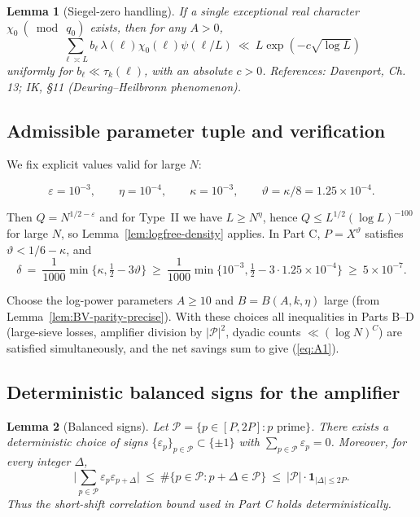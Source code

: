 \documentclass[11pt]{article}
\def\eqref#1{(\ref{#1})}%
\newtheorem{lemma}{Lemma}[part]
\theoremstyle{definition}
\theoremstyle{remark}
\numberwithin{equation}{part}
\begin{document}
\begin{lemma}[Siegel-zero handling]\label{lem:siegel}
	If a single exceptional real character $\chi_0\ (\bmod\ q_0)$ exists, then for any $A>0$,
	\[
		\sum_{\ell\asymp L} b_\ell\,\lambda(\ell)\chi_0(\ell)\psi(\ell/L)\ \ll\ L\exp(-c\sqrt{\log L})
	\]
	uniformly for $b_\ell\ll \tau_k(\ell)$, with an absolute $c>0$. References: Davenport, Ch. 13; IK, §11 (Deuring--Heilbronn phenomenon).
\end{lemma}

\subsection{Admissible parameter tuple and verification}

We fix explicit values valid for large $N$:

\[
	\varepsilon=10^{-3},\qquad \eta=10^{-4},\qquad \kappa=10^{-3},\qquad \vartheta=\kappa/8=1.25\times 10^{-4}.
\]

Then $Q=N^{1/2-\varepsilon}$ and for Type~II we have $L\ge N^{\eta}$, hence $Q\le L^{1/2}(\log L)^{-100}$ for large $N$, so Lemma~\ref{lem:logfree-density} applies. In Part C, $P=X^{\vartheta}$ satisfies $\vartheta<1/6-\kappa$, and
\[
	\delta\ =\ \frac1{1000}\min\{\kappa,\tfrac12-3\vartheta\}\ \ge\ \frac{1}{1000}\min\{10^{-3},\tfrac12-3\cdot 1.25\times 10^{-4}\}\ \ge\ 5\times 10^{-7}.
\]

Choose the log-power parameters $A\ge 10$ and $B=B(A,k,\eta)$ large (from Lemma~\ref{lem:BV-parity-precise}). With these choices all inequalities in Parts B--D (large-sieve losses, amplifier division by $|\mathcal P|^2$, dyadic counts $\ll (\log N)^C$) are satisfied simultaneously, and the net savings sum to give \eqref{eq:A1}.

\subsection{Deterministic balanced signs for the amplifier}

\begin{lemma}[Balanced signs]\label{lem:balanced-signs}
	Let $\mathcal P=\{p\in[P,2P]: p\text{ prime}\}$. There exists a deterministic choice of signs $\{\varepsilon_p\}_{p\in\mathcal P}\subset\{\pm 1\}$ with $\sum_{p\in\mathcal P}\varepsilon_p=0$. Moreover, for every integer $\Delta$,
	\[
		\Big|\sum_{p\in\mathcal P}\varepsilon_p\varepsilon_{p+\Delta}\Big|\ \le\ \#\{p\in\mathcal P: p+\Delta\in\mathcal P\}\ \le\ |\mathcal P|\cdot \mathbf 1_{|\Delta|\le 2P}.
	\]
	Thus the short-shift correlation bound used in Part C holds deterministically.
\end{lemma}
\end{document}
